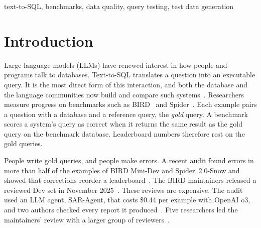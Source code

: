 \documentclass[conference]{IEEEtran}
\begin{document}
\begin{IEEEkeywords}
text-to-SQL, benchmarks, data quality, query testing, test data generation
\end{IEEEkeywords}

\section{Introduction}

Large language models (LLMs) have renewed interest in how people and programs
talk to databases. Text-to-SQL translates a question into an executable query.
It is the most direct form of this interaction, and both the database and the
language communities now build and compare such
systems~\cite{li2024dawn,floratou2024nl2sql,lei2025spider2}. Researchers measure
progress on benchmarks such as BIRD~\cite{li2024bird} and
Spider~\cite{yu2018spider}. Each example pairs a question with a database and a
reference query, the \emph{gold} query. A benchmark scores a system's query as
correct when it returns the same result as the gold query on the benchmark
database. Leaderboard numbers therefore rest on the gold queries.

People write gold queries, and people make errors. A recent audit found errors
in more than half of the examples of BIRD Mini-Dev and Spider~2.0-Snow and
showed that corrections reorder a leaderboard~\cite{jin2026pervasive}. The BIRD
maintainers released a reviewed Dev set in November 2025~\cite{bird2025dev}.
These reviews are expensive. The audit used an LLM agent, SAR-Agent, that costs
\$0.44 per example with OpenAI o3, and two authors checked every report it
produced~\cite{jin2026pervasive}. Five researchers led the maintainers' review
with a larger group of reviewers~\cite{bird2025dev}.
\end{document}
